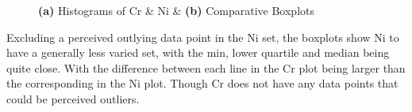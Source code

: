 \documentclass[11pt]{article}
\begin{document}
\begin{enumerate}
              \begin{figure}[h]
                      \centering
                      \hfill
                      \hfill
                      \caption{\textbf{(a)} Histograms of Cr \& Ni \& \textbf{(b)} Comparative Boxplots}
                      \label{fig_graph}
              \end{figure}


              Excluding a perceived outlying data point in the Ni set, the boxplots show Ni to have a generally less varied set, with the min, lower quartile and median being quite close. With the difference between each line in the Cr plot being larger than the corresponding in the Ni plot. Though Cr does not have any data points that could be perceived outliers.


\end{enumerate}
\end{document}
